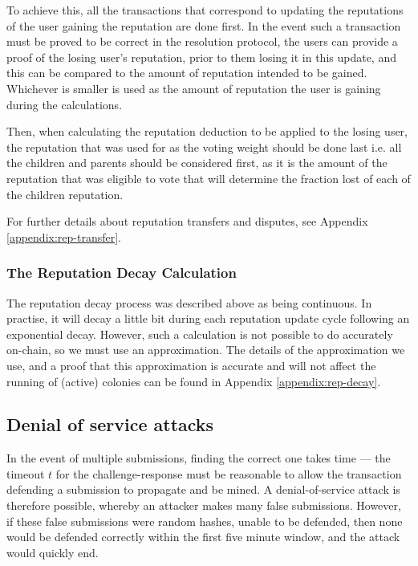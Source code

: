 To achieve this, all the transactions that correspond to updating the reputations of the user gaining the reputation are done first. In the event such a transaction must be proved to be correct in the resolution protocol, the users can provide a proof of the losing user's reputation, prior to them losing it in this update, and this can be compared to the amount of reputation intended to be gained. Whichever is smaller is used as the amount of reputation the user is gaining during the calculations.

Then, when calculating the reputation deduction to be applied to the losing user, the reputation that was used for as the voting weight should be done last i.e. all the children and parents should be considered first, as it is the amount of the reputation that was eligible to vote that will determine the fraction lost of each of the children reputation. %

For further details about reputation transfers and disputes, see Appendix \ref{appendix:rep-transfer}.

\subsubsection{The Reputation Decay Calculation}\label{sec:repdecay}
The reputation decay process was described above as being continuous. In practise, it will decay a little bit during each reputation update cycle following an exponential decay. However, such a calculation is not possible to do accurately on-chain, so we must use an approximation. The details of the approximation we use, and a proof that this approximation is accurate and will not affect the running of (active) colonies can be found in Appendix \ref{appendix:rep-decay}.

\subsection{Denial of service attacks}\label{sec:mining-possible-attacks}

In the event of multiple submissions, finding the correct one takes time --- the timeout $t$ for the challenge-response must be reasonable to allow the transaction defending a submission to propagate and be mined. A denial-of-service attack is therefore possible, whereby an attacker makes many false submissions. However, if these false submissions were random hashes, unable to be defended, then none would be defended correctly within the first five minute window, and the attack would quickly end. 

